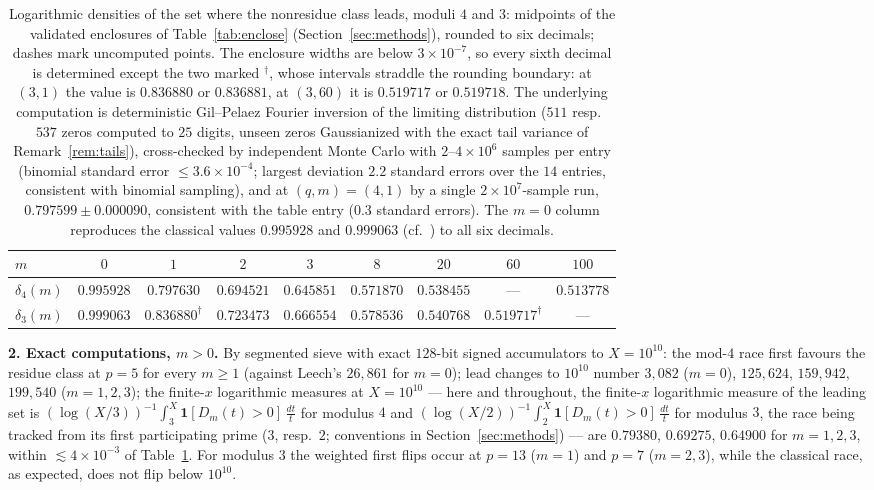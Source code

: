 \documentclass[11pt]{article}
\begin{document}
\begin{table}[h]\centering
\setlength{\tabcolsep}{4pt}
\begin{tabular}{lcccccccc}
\toprule
$m$ & $0$ & $1$ & $2$ & $3$ & $8$ & $20$ & $60$ & $100$\\
\midrule
$\delta_4(m)$ & $0.995928$ & $0.797630$ & $0.694521$ & $0.645851$
& $0.571870$ & $0.538455$ & --- & $0.513778$\\
$\delta_3(m)$ & $0.999063$ & $0.836880^{\dagger}$ & $0.723473$ & $0.666554$
& $0.578536$ & $0.540768$ & $0.519717^{\dagger}$ & --- \\
\bottomrule
\end{tabular}
\caption{Logarithmic densities of the set where the nonresidue class
leads, moduli $4$ and $3$: midpoints of the validated enclosures of
Table~\ref{tab:enclose} (Section~\ref{sec:methods}), rounded to six
decimals; dashes mark uncomputed points. The enclosure widths are
below $3\times10^{-7}$, so every sixth decimal is determined except
the two marked $^{\dagger}$, whose intervals straddle the rounding
boundary: at $(3,1)$ the value is $0.836880$ or $0.836881$, at
$(3,60)$ it is $0.519717$ or $0.519718$. The underlying computation is
deterministic Gil--Pelaez Fourier inversion of the limiting
distribution ($511$ resp.\ $537$ zeros computed to $25$ digits, unseen
zeros Gaussianized with the exact tail variance of
Remark~\ref{rem:tails}), cross-checked by independent Monte Carlo with
$2$--$4\times10^6$ samples per entry (binomial standard error
$\le3.6\times10^{-4}$; largest deviation $2.2$ standard errors over
the $14$ entries, consistent with binomial sampling), and at
$(q,m)=(4,1)$ by a single $2\times10^7$-sample run,
$0.797599\pm0.000090$, consistent with the table entry ($0.3$ standard
errors). The $m=0$ column reproduces the classical values $0.995928$
and $0.999063$ (cf.\ \cite{RS94,FM13}) to all six decimals.}
\label{tab:delta}
\end{table}

\textbf{2. Exact computations, $m>0$.} By segmented sieve with exact
$128$-bit signed accumulators to $X=10^{10}$: the mod-$4$ race first
favours the residue class at $p=5$ for every $m\ge1$ (against Leech's
$26{,}861$ for $m=0$); lead changes to $10^{10}$ number $3{,}082$
($m=0$), $125{,}624$, $159{,}942$, $199{,}540$ ($m=1,2,3$); the
finite-$x$ logarithmic measures at $X=10^{10}$ --- here and throughout,
the finite-$x$ logarithmic measure of the leading set is
$(\log(X/3))^{-1}\int_3^X\mathbf 1[D_m(t)>0]\,\frac{dt}{t}$ for modulus
$4$ and $(\log(X/2))^{-1}\int_2^X\mathbf 1[D_m(t)>0]\,\frac{dt}{t}$ for
modulus $3$, the race being tracked from its first participating prime
($3$, resp.\ $2$; conventions in Section~\ref{sec:methods}) --- are
$0.79380$, $0.69275$, $0.64900$ for $m=1,2,3$, within
$\lesssim4\times10^{-3}$ of Table~\ref{tab:delta}. For modulus $3$ the weighted first flips occur
at $p=13$ ($m=1$) and $p=7$ ($m=2,3$), while the classical race, as
expected, does not flip below $10^{10}$.
\end{document}
